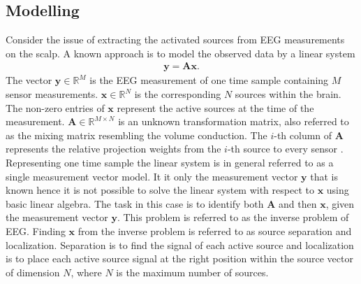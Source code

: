 %     


\subsection{Modelling}
Consider the issue of extracting the activated sources from  EEG measurements on the scalp. A known approach is to model the observed data by a linear system 
\begin{align*}
\mathbf{y} = \mathbf{Ax}.
\end{align*}
The vector $\mathbf{y} \in \mathbb{R}^{M}$ is the EEG measurement of one time sample containing $M$ sensor measurements. $\mathbf{x} \in \mathbb{R}^{N}$ is the corresponding $N$ sources within the brain. 
The non-zero entries of $\textbf{x}$ represent the active sources at the time of the measurement. 
$\mathbf{A} \in \mathbb{R}^{M \times N}$ is an unknown transformation matrix, also referred to as the mixing matrix resembling the volume conduction. 
The $i$-th column of $\mathbf{A}$ represents the relative projection weights from the $i$-th source to every sensor \cite{phd2015}. 
Representing one time sample the linear system is in general referred to as a single measurement vector model. 
It it only the measurement vector $\textbf{y}$ that is known hence it is not possible to solve the linear system with respect to $\textbf{x}$ using basic linear algebra.   
The task in this case is to identify both $\mathbf{A}$ and then $\mathbf{x}$, given the measurement vector $\mathbf{y}$. This problem is referred to as the inverse problem of EEG. 
Finding $\textbf{x}$ from the inverse problem is referred to as source separation and localization. Separation is to find the signal of each active source and localization is to place each active source signal at the right position within the source vector of dimension $N$, where $N$ is the maximum number of sources.      
